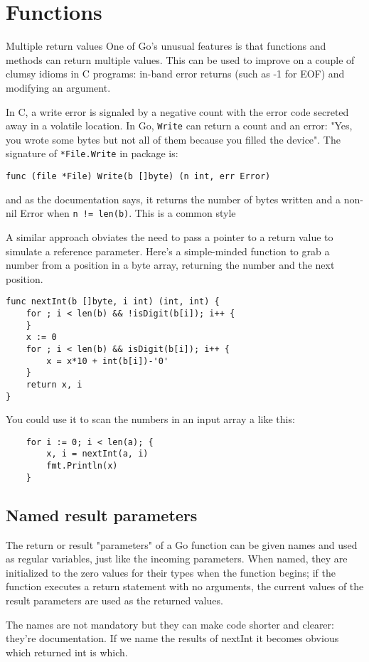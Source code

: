 \section{Functions}
Multiple return values
One of Go's unusual features is that functions and methods can return multiple
values. This can be used to improve on a couple of clumsy idioms in C programs:
in-band error returns (such as -1 for EOF) and modifying an argument.

In C, a write error is signaled by a negative count with the error code
secreted away in a volatile location. In Go, \lstinline{Write} can return a count and an
error: "Yes, you wrote some bytes but not all of them because you filled the
device". The signature of \lstinline{*File.Write} in package
 is:
\begin{lstlisting}
func (file *File) Write(b []byte) (n int, err Error)
\end{lstlisting}
and as the documentation says, it returns the number of bytes written and a
non-nil Error when \lstinline{n != len(b)}. This is a common style

A similar approach obviates the need to pass a pointer to a return value to
simulate a reference parameter. Here's a simple-minded function to grab a
number from a position in a byte array, returning the number and the next
position.
\begin{lstlisting}
func nextInt(b []byte, i int) (int, int) {
    for ; i < len(b) && !isDigit(b[i]); i++ {
    }
    x := 0
    for ; i < len(b) && isDigit(b[i]); i++ {
        x = x*10 + int(b[i])-'0'
    }
    return x, i
}
\end{lstlisting}
You could use it to scan the numbers in an input array a like this:
\begin{lstlisting}
    for i := 0; i < len(a); {
        x, i = nextInt(a, i)
        fmt.Println(x)
    }
\end{lstlisting}
\subsection{Named result parameters}
The return or result "parameters" of a Go function can be given names and used
as regular variables, just like the incoming parameters. When named, they are
initialized to the zero values for their types when the function begins; if the
function executes a return statement with no arguments, the current values of
the result parameters are used as the returned values.

The names are not mandatory but they can make code shorter and clearer: they're
documentation. If we name the results of nextInt it becomes obvious which
returned int is which.

